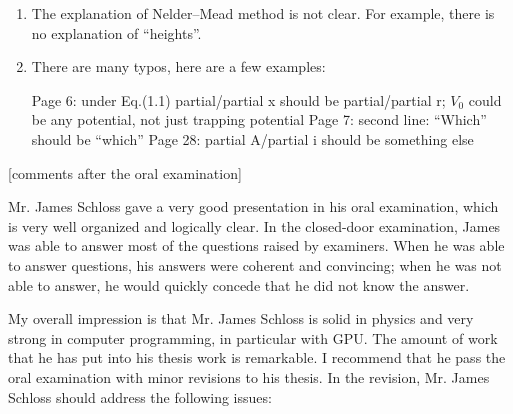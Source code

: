 \documentclass[11pt]{article}
\begin{document}
\begin{enumerate}
\item The explanation of Nelder–Mead method is not clear. For example, there is no explanation of “heights”.


\item There are many typos, here are a few examples:

Page 6: under Eq.(1.1) partial/partial x should be partial/partial r; $V_0$ could be any potential, not just trapping potential Page 7: second line: “Which” should be “which” Page 28: partial A/partial i should be something else


\end{enumerate}
[comments after the oral examination]

Mr. James Schloss gave a very good presentation in his oral examination, which is very well organized and logically clear. In the closed-door examination, James was able to answer most of the questions raised by examiners. When he was able to answer questions, his answers were coherent and convincing; when he was not able to answer, he would quickly concede that he did not know the answer.

My overall impression is that Mr. James Schloss is solid in physics and very strong in computer programming, in particular with GPU. The amount of work that he has put into his thesis work is remarkable. I recommend that he pass the oral examination with minor revisions to his thesis. In the revision, Mr. James Schloss should address the following issues:
\end{document}
